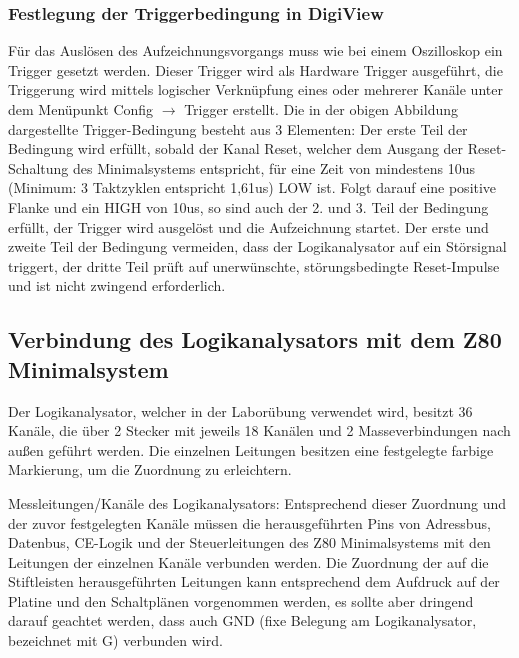 \subsubsection{Festlegung der Triggerbedingung in DigiView}
Für das Auslösen des Aufzeichnungsvorgangs muss wie bei einem Oszilloskop ein Trigger gesetzt werden. Dieser Trigger wird als Hardware Trigger ausgeführt, die Triggerung wird mittels logischer Verknüpfung eines oder mehrerer Kanäle unter dem Menüpunkt Config $\rightarrow$ Trigger erstellt.
Die in der obigen Abbildung dargestellte Trigger-Bedingung besteht aus 3 Elementen: Der erste Teil der Bedingung wird erfüllt, sobald der Kanal Reset, welcher dem Ausgang der Reset-Schaltung des Minimalsystems entspricht, für eine Zeit von mindestens 10us (Minimum: 3 Taktzyklen entspricht 1,61us) LOW ist. Folgt darauf eine positive Flanke und ein HIGH von 10us, so sind auch der 2. und 3. Teil der Bedingung erfüllt, der Trigger wird ausgelöst und die Aufzeichnung startet. Der erste und zweite Teil der Bedingung vermeiden, dass der Logikanalysator auf ein Störsignal triggert, der dritte Teil prüft auf unerwünschte, störungsbedingte Reset-Impulse und ist nicht zwingend erforderlich.

\subsection{Verbindung des Logikanalysators mit dem Z80 Minimalsystem}
Der Logikanalysator, welcher in der Laborübung verwendet wird, besitzt 36 Kanäle, die über 2 Stecker mit jeweils 18 Kanälen und 2 Masseverbindungen nach außen geführt werden. Die einzelnen Leitungen besitzen eine festgelegte farbige Markierung, um die Zuordnung zu erleichtern.

Messleitungen/Kanäle des Logikanalysators:
Entsprechend dieser Zuordnung und der zuvor festgelegten Kanäle müssen die herausgeführten Pins von Adressbus, Datenbus, CE-Logik und der Steuerleitungen des Z80 Minimalsystems mit den Leitungen der einzelnen Kanäle verbunden werden.
Die Zuordnung der auf die Stiftleisten herausgeführten Leitungen kann entsprechend dem Aufdruck auf der Platine und den Schaltplänen vorgenommen werden, es sollte aber dringend darauf geachtet werden, dass auch GND (fixe Belegung am Logikanalysator, bezeichnet mit G) verbunden wird.

